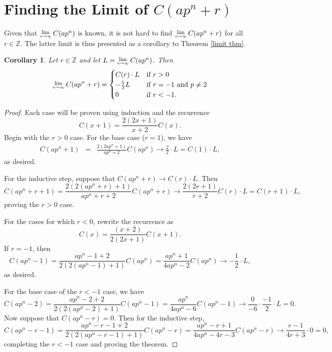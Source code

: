 \documentclass[12pt, letter]{article}    %
\theoremstyle{plain}
\newtheorem{corollary}[theorem]{Corollary}
\theoremstyle{definition}
\numberwithin{equation}{section}
\newcommand{\Lim}[1]{\raisebox{0.5ex}{\scalebox{0.8}{$\displaystyle \lim_{#1}\;$}}}
\newcommand{\thref}[1]{Theorem \ref{#1}}
\newcommand{\thlabel}[1]{\label{#1}}
\begin{document}
\section{Finding the Limit of $C(ap^n+r)$}


Given that $\Lim{n\rightarrow\infty}C(ap^n)$ is known, it is not hard to find $\Lim{n\rightarrow\infty}C(ap^n+r)$ for all $r\in\mathbb{Z}$. The latter limit is thus presented as a corollary to \thref{limit thm}.

\begin{corollary}\thlabel{limit cor}Let $r\in\mathbb{Z}$ and let $L=\Lim{n\rightarrow\infty}C(ap^n)$. Then
$$\Lim{n\rightarrow\infty}C(ap^n+r)=\begin{cases}
C(r)\cdot L & \mbox{if }r>0\\
-\frac{1}{2}L & \mbox{if } r=-1 \text{ and } p\neq 2\\
0 & \mbox{if } r<-1.
\end{cases}$$
\end{corollary}

\begin{proof}
Each case will be proven using induction and the recurrence $$C(x+1)=\frac{2(2x+1)}{x+2}C(x).$$
Begin with the $r>0$ case. For the base case ($r=1$), we have
\begin{eqnarray*}
C(ap^n+1)&=&\frac{2(2ap^n+1)}{ap^n+2}C(ap^n)
\rightarrow \frac{2}{2}\cdot L=C(1)\cdot L,
\end{eqnarray*}
as desired.

For the inductive step, suppose that $C(ap^n+r)\rightarrow C(r)\cdot L.$ Then $$C(ap^n+r+1)=\frac{2(2(ap^n+r)+1)}{ap^n+r+2}C(ap^n+r)\rightarrow \frac{2(2r+1)}{r+2}C(r)\cdot L=C(r+1)\cdot L,$$
proving the $r>0$ case.

For the cases for which $r<0$, rewrite the recurrence as $$C(x)=\frac{(x+2)}{2(2x+1)}C(x+1).$$
If $r=-1$, then
$$C(ap^n-1)=\frac{ap^n-1+2}{2(2(ap^n-1)+1)}C(ap^n)=\frac{ap^n+1}{4ap^n-2}C(ap^n)\rightarrow -\frac{1}{2}\cdot L,$$ as desired.

For the base case of the $r<-1$ case, we have
$$C(ap^n-2)=\frac{ap^n-2+2}{2(2(ap^n-2)+1)}C(ap^n-1)=\frac{ap^n}{4ap^n-6}C(ap^n-1)\rightarrow\frac{0}{-6}\cdot\frac{-1}{2}\cdot L=0.$$
Now suppose that $C(ap^n-r)=0$. Then for the inductive step,
$$C(ap^n-r-1)=\frac{ap^n-r-1+2}{2(2(ap^n-r-1)+1)}C(ap^n-r)=\frac{ap^n-r+1}{4ap^n-4r-3}C(ap^n-r)\rightarrow\frac{r-1}{4r+3}\cdot 0=0,$$
completing the $r<-1$ case and proving the theorem. \end{proof}
\end{document}
